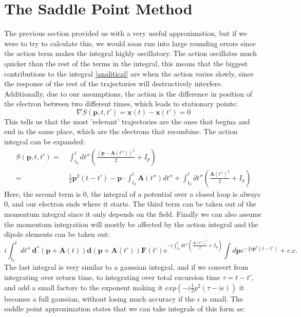 \documentclass[11pt,a4paper]{report}
\begin{document}
\section{The Saddle Point Method}
The previous section provided us with a very useful approximation, but if we were to try to calculate this, we would soon run into large rounding errors since the action term makes the integral highly oscillatory. The action oscillates much quicker than the rest of the terms in the integral, this means that the biggest contributions to the integral \eqref{analitical} are when the action varies slowly, since the response of the rest of the trajectories will destructively interfere. Additionally, due to our assumptions, the action is the difference in position of the electron between two different times, which leads to stationary points:
\begin{equation}
\nabla S(\mathbf{p},t,t') = \mathbf{x}(t) - \mathbf{x}(t')  = 0
\end{equation}
This tells us that the most 'relevant' trajectories are the ones that begina and end in the same place, which are the electrons that recombine. The action integral can be expanded:
\begin{equation}
\begin{split}
S(\mathbf{p},t,t') = \; & \int^{t}_{t_0} dt'' \left(\frac{(\mathbf{p} - \mathbf{A}(t''))^2}{2} + I_p \right) \\
=\; &\frac{1}{2} \mathbf{p}^2 (t - t') - \mathbf{p} \cdot \int^{t}_{t_0} \mathbf{A}(t'')dt'' + \int^{t}_{t_0} dt'' \left(\frac{\mathbf{A}(t'')^2}{2} + I_p \right)
\end{split}
\end{equation}
Here, the second term is 0, the integral of a potential over a closed loop is always 0, and our electron ends where it starts. The third term can be taken out of the momentum integral since it only depends on the field. Finally we can also assume the momentum integration will mostly be affected by the action integral and the dipole elements can be taken out:
\begin{equation}
i\int^t_{t_0} dt''\: \mathbf{d}^*  (\mathbf{p} + \mathbf{A}(t)) \mathbf{d}(\mathbf{p} + \mathbf{A}(t'))\mathbf{F}(t') e^{-i \int^t_{t_0} dt'' \left(\frac{\mathbf{A}(t'')^2}{2} + I_p \right)} \int d\mathbf{p} e^{-\frac{1}{2}i \mathbf{p}^2 (t - t')} + c.c.
\end{equation}
The last integral is very similar to a gaussian integral, and if we convert from integrating over return time, to integrating over total excursion time $\tau = t - t'$, and add a small factor$\epsilon$ to the exponent making it $exp(-i\frac{1}{2}p^2 (\tau - i \epsilon))$ it becomes a full gaussian, without losing much accuracy if the $\epsilon$ is small. The saddle point approximation states that we can take integrals of this form as:
\end{document}
